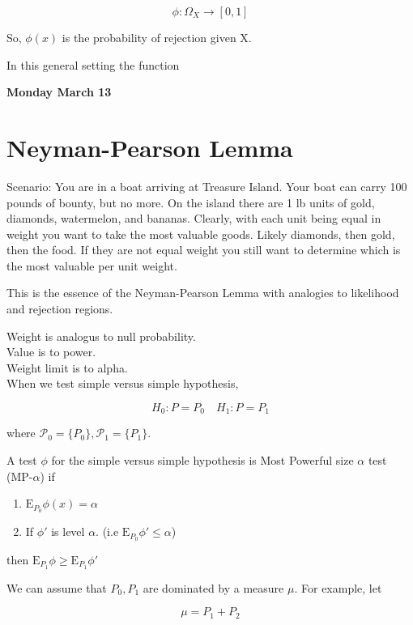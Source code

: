 \documentclass[11pt,fleqn]{book} %
\newcommand{\E}{\mathrm{E}}
\begin{document}
		$$\phi: \Omega_X \rightarrow [0, 1] $$

So, $\phi(x)$ is the probability of rejection given X. 

In this general setting the function 

\textbf{Monday March 13}\\

\section{Neyman-Pearson Lemma}

Scenario: You are in a boat arriving at Treasure Island. Your boat can carry 100 pounds of bounty, but no more. On the island there are 1 lb units of gold, diamonds, watermelon, and bananas. Clearly, with each unit being equal in weight you want to take the most valuable goods. Likely diamonds, then gold, then the food. If they are not equal weight you still want to determine which is the most valuable per unit weight. 

This is the essence of the Neyman-Pearson Lemma with analogies to likelihood and rejection regions. 

Weight is analogus to null probability. \\
Value is to power. \\
Weight limit is to alpha.\\


When we test simple versus simple hypothesis, 

		$$H_0: P = P_0 \quad H_1: P = P_1 $$

where $\mathcal{P}_0  = \{P_0\}, \mathcal{P}_1 = \{P_1\}$. 


\begin{definition}
	A test $\phi$ for the simple versus simple hypothesis is Most Powerful size $\alpha$ test (MP-$\alpha$) if

	\begin{enumerate}
		\item $\E _{P_0} \phi(x) = \alpha$
		\item If $\phi'$ is level $\alpha$. (i.e $\E _{P_0} \phi' \leq \alpha$)
	\end{enumerate}

	then $\E _{P_1} \phi \geq \E _{P_1} \phi'$
\end{definition}

We can assume that $P_0, P_1$ are dominated by a measure $\mu$. For example, let 

	$$\mu = P_1 + P_2 $$
\end{document}
